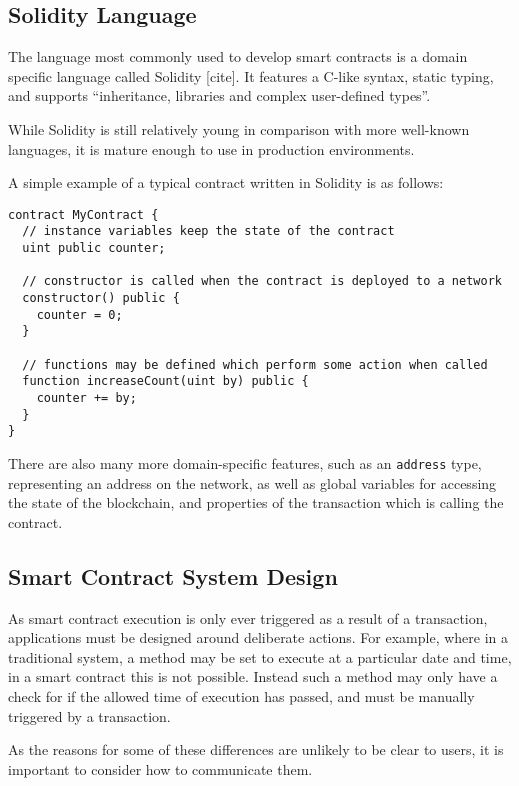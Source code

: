 \subsection{Solidity Language}

The language most commonly used to develop smart contracts is a domain specific language called Solidity [cite]. It features a C-like syntax, static typing, and supports \enquote{inheritance, libraries and complex user-defined types}. %

While Solidity is still relatively young in comparison with more well-known languages, it is mature enough to use in production environments.

A simple example of a typical contract written in Solidity is as follows:

\begin{lstlisting}[language=Solidity]
contract MyContract {
  // instance variables keep the state of the contract
  uint public counter;

  // constructor is called when the contract is deployed to a network
  constructor() public {
    counter = 0;
  }

  // functions may be defined which perform some action when called
  function increaseCount(uint by) public {
    counter += by;
  }
}
\end{lstlisting}

There are also many more domain-specific features, such as an \lstinline{address} type, representing an address on the network, as well as global variables for accessing the state of the blockchain, and properties of the transaction which is calling the contract.

\subsection{Smart Contract System Design}

As smart contract execution is only ever triggered as a result of a transaction, applications must be designed around deliberate actions. For example, where in a traditional system, a method may be set to execute at a particular date and time, in a smart contract this is not possible. Instead such a method may only have a check for if the allowed time of execution has passed, and must be manually triggered by a transaction.

As the reasons for some of these differences are unlikely to be clear to users, it is important to consider how to communicate them.

